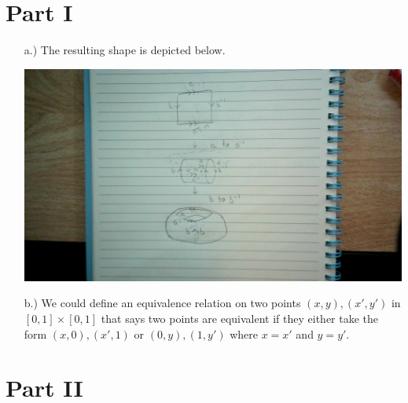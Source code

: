 \documentclass[12pt]{article}
\begin{document}
\pagestyle{fancy}
\fancyhead{}

\normalsize

\section*{Part I}

\begin{itemize}
    \item [a.)] The resulting shape is depicted below.

    \begin{center}
        \includegraphics[scale=0.1]{images/Question1.jpeg}
    \end{center}

    \item [b.)] We could define an equivalence relation on two points $(x,y),(x',y')$ in $[0,1]\times[0,1]$ that says two points are equivalent if they either take the form $(x,0),(x',1)$ or $(0,y),(1,y')$ where $x=x'$ and $y=y'$.
\end{itemize}

\pagebreak
\section*{Part II}
\end{document}
